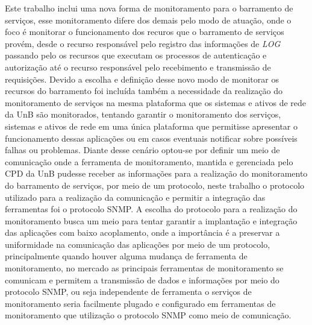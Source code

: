 {Este trabalho inclui uma nova forma de monitoramento para o barramento de serviços, esse monitoramento difere dos demais pelo modo de atuação, onde o foco é monitorar o funcionamento dos recuros que o barramento de serviços provém, desde o recurso responsável pelo registro das informações de \textit{LOG} passando pelo os recursos que executam os processos de autenticação e autorização até o recurso responsável pelo recebimento e transmissão de requisições. Devido a escolha e definição desse novo modo de monitorar os recursos do barramento foi incluída também a necessidade da realização do monitoramento de serviços na mesma plataforma que os sistemas e ativos de rede da \acrshort{UnB} são monitorados, tentando garantir o monitoramento dos serviços, sistemas e ativos de rede em uma única plataforma que permitisse apresentar o funcionamento dessas aplicações ou em casos eventuais notificar sobre possíveis falhas ou problemas. Diante desse cenário optou-se por definir um meio de comunicação onde a ferramenta de monitoramento, mantida e gerenciada pelo \acrshort{CPD} da \acrshort{UnB} pudesse receber as informações para a realização do monitoramento do barramento de serviços, por meio de um protocolo, neste trabalho o protocolo utilizado para a realização da comunicação e permitir a integração das ferramentas foi o protocolo \acrshort{SNMP}. A escolha do protocolo para a realização do monitoramento busca um meio para tentar garantir a implantação e integração das aplicações com baixo acoplamento, onde a importância é a preservar a uniformidade na comunicação das aplicações por meio de um protocolo, principalmente quando houver alguma mudança de ferramenta de monitoramento, no mercado as principais ferramentas de monitoramento se comunicam e permitem a transmissão de dados e informações por meio do protocolo \acrshort{SNMP}, ou seja independente de ferramenta o serviços de monitoramento seria facilmente plugado e configurado em ferramentas de monitoramento que utilização o protocolo \acrshort{SNMP} como meio de comunicação.      

}
